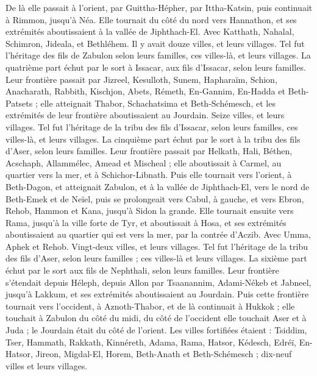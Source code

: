 \begin{multicols}{2}
De là elle passait à l’orient, par Guittha-Hépher, par Ittha-Katsin, puis continuait à Rimmon, jusqu’à Néa.
Elle tournait du côté du nord vers Hannathon, et ses extrémités aboutissaient à la vallée de Jiphthach-El.
Avec Katthath, Nahalal, Schimron, Jideala, et Bethléhem. Il y avait douze villes, et leurs villages.
Tel fut l’héritage des fils de Zabulon selon leurs familles, ces villes-là, et leurs villages.
La quatrième part échut par le sort à Issacar, aux fils d’Issacar, selon leurs familles.
Leur frontière passait par Jizreel, Kesulloth, Sunem,
Hapharaïm, Schion, Anacharath,
Rabbith, Kischjon, Abets,
Rémeth, En-Gannim, En-Hadda et Beth-Patsets ;
elle atteignait Thabor, Schachatsima et Beth-Schémesch, et les extrémités de leur frontière aboutissaient au Jourdain. Seize villes, et leurs villages.
Tel fut l’héritage de la tribu des fils d’Issacar, selon leurs familles, ces villes-là, et leurs villages.
La cinquième part échut par le sort à la tribu des fils d’Aser, selon leurs familles.
Leur frontière passait par Helkath, Hali, Béthen, Acschaph,
Allammélec, Amead et Mischeal ; elle aboutissait à Carmel, au quartier vers la mer, et à Schichor-Libnath.
Puis elle tournait vers l’orient, à Beth-Dagon, et atteignait Zabulon, et à la vallée de Jiphthach-El, vers le nord de Beth-Emek et de Neïel, puis se prolongeait vers Cabul, à gauche,
et vers Ebron, Rehob, Hammon et Kana, jusqu’à Sidon la grande.
Elle tournait ensuite vers Rama, jusqu’à la ville forte de Tyr, et aboutissait à Hosa, et ses extrémités aboutissaient au quartier qui est vers la mer, par la contrée d’Aczib.
Avec Umma, Aphek et Rehob. Vingt-deux villes, et leurs villages.
Tel fut l’héritage de la tribu des fils d’Aser, selon leurs familles ; ces villes-là et leurs villages.
La sixième part échut par le sort aux fils de Nephthali, selon leurs familles.
Leur frontière s’étendait depuis Héleph, depuis Allon par Tsaanannim, Adami-Nékeb et Jabneel, jusqu’à Lakkum, et ses extrémités aboutissaient au Jourdain.
Puis cette frontière tournait vers l’occident, à Aznoth-Thabor, et de là continuait à Hukkok ; elle touchait à Zabulon du côté du midi, du côté de l’occident elle touchait Aser et à Juda ; le Jourdain était du côté de l’orient.
Les villes fortifiées étaient : Tsiddim, Tser, Hammath, Rakkath, Kinnéreth,
Adama, Rama, Hatsor,
Kédesch, Edréï, En-Hatsor,
Jireon, Migdal-El, Horem, Beth-Anath et Beth-Schémesch ; dix-neuf villes et leurs villages.

\end{multicols}
